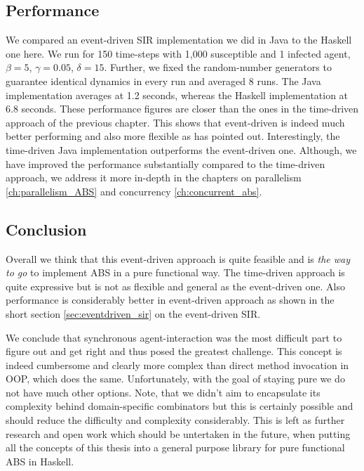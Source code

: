 \subsection{Performance}
We compared an event-driven SIR implementation we did in Java to the Haskell one here. We run for 150 time-steps with 1,000 susceptible and 1 infected agent, $\beta = 5$, $\gamma = 0.05$, $\delta = 15$. Further, we fixed the random-number generators to guarantee identical dynamics in every run and averaged 8 runs. The Java implementation averages at 1.2 seconds, whereas the Haskell implementation at 6.8 seconds. These performance figures are closer than the ones in the time-driven approach of the previous chapter. This shows that event-driven is indeed much better performing and also more flexible as \cite{meyer_event-driven_2014} has pointed out. Interestingly, the time-driven Java implementation outperforms the event-driven one. Although, we have improved the performance substantially compared to the time-driven approach, we address it more in-depth in the chapters on parallelism \ref{ch:parallelism_ABS} and concurrency \ref{ch:concurrent_abs}.


\subsection{Conclusion}
Overall we think that this event-driven approach is quite feasible and is \textit{the way to go} to implement ABS in a pure functional way. The time-driven approach is quite expressive but is not as flexible and general as the event-driven one. Also performance is considerably better in event-driven approach as shown in the short section \ref{sec:eventdriven_sir} on the event-driven SIR.

We conclude that synchronous agent-interaction was the most difficult part to figure out and get right and thus posed the greatest challenge. This concept is indeed cumbersome and clearly more complex than direct method invocation in OOP, which does the same. Unfortunately, with the goal of staying pure we do not have much other options. Note, that we didn't aim to encapsulate its complexity behind domain-specific combinators but this is certainly possible and should reduce the difficulty and complexity considerably. This is left as further research and open work which should be untertaken in the future, when putting all the concepts of this thesis into a general purpose library for pure functional ABS in Haskell.

